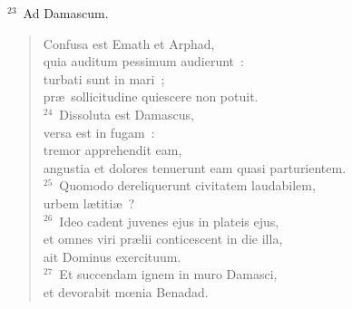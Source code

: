 ${}^{23}$~Ad Damascum. \begin{flushleft}\begin{verse}Confusa est Emath et Arphad,\\ quia auditum pessimum audierunt~:\\ turbati sunt in mari~;\\ pr\ae\ sollicitudine quiescere non potuit.\\
${}^{24}$~Dissoluta est Damascus,\\ versa est in fugam~:\\ tremor apprehendit eam,\\ angustia et dolores tenuerunt eam quasi parturientem.\\
${}^{25}$~Quomodo dereliquerunt civitatem laudabilem,\\ urbem l\ae titi\ae~?\\
${}^{26}$~Ideo cadent juvenes ejus in plateis ejus,\\ et omnes viri pr\ae lii conticescent in die illa,\\ ait Dominus exercituum.\\
${}^{27}$~Et succendam ignem in muro Damasci,\\ et devorabit mœnia Benadad.\end{verse}\end{flushleft}


